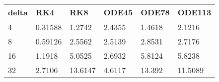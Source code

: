 \begin{tabular}{llllll}
delta & RK4 & RK8 & ODE45 & ODE78 & ODE113 \\ 
\hline 
4 & 0.31588 & 1.2742 & 2.4355 & 1.4618 & 2.1216 \\ 
8 & 0.59126 & 2.5562 & 2.5139 & 2.8531 & 2.7176 \\ 
16 & 1.1918 & 5.0525 & 2.6932 & 5.8124 & 5.8238 \\ 
32 & 2.7106 & 13.6147 & 4.6117 & 13.392 & 11.5089 \\ 
\hline 
\end{tabular}